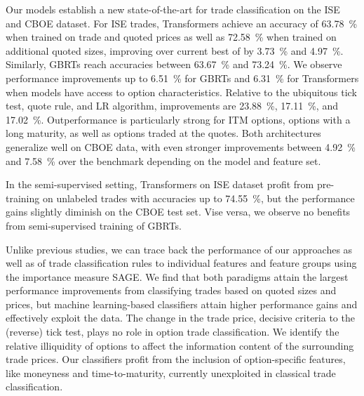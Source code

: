Our models establish a new state-of-the-art for trade classification on the \gls{ISE} and \gls{CBOE} dataset. For \gls{ISE} trades, Transformers achieve an accuracy of \SI{63.78}{\percent} when trained on trade and quoted prices as well as \SI{72.58}{\percent} when trained on additional quoted sizes, improving over current best of \textcite[][27]{grauerOptionTradeClassification2022} by \SI{3.73}{\percent} and \SI{4.97}{\percent}. Similarly, \glspl{GBRT} reach accuracies between \SI{63.67}{\percent} and \SI{73.24}{\percent}. We observe performance improvements up to \SI{6.51}{\percent} for \glspl{GBRT} and \SI{6.31}{\percent} for Transformers when models have access to option characteristics. Relative to the ubiquitous tick test, quote rule, and \gls{LR} algorithm, improvements are \SI{23.88}{\percent}, \SI{17.11}{\percent}, and \SI{17.02}{\percent}. Outperformance is particularly strong for \gls{ITM} options, options with a long maturity, as well as options traded at the quotes. Both architectures generalize well on \gls{CBOE} data, with even stronger improvements between \SI{4.92}{\percent} and \SI{7.58}{\percent} over the benchmark depending on the model and feature set. 

In the semi-supervised setting, Transformers on \gls{ISE} dataset profit from pre-training on unlabeled trades with accuracies up to \SI{74.55}{\percent}, but the performance gains slightly diminish on the \gls{CBOE} test set. Vise versa, we observe no benefits from semi-supervised training of \glspl{GBRT}.

Unlike previous studies, we can trace back the performance of our approaches as well as of trade classification rules to individual features and feature groups using the importance measure \gls{SAGE}. We find that both paradigms attain the largest performance improvements from classifying trades based on quoted sizes and prices, but machine learning-based classifiers attain higher performance gains and effectively exploit the data. The change in the trade price, decisive criteria to the (reverse) tick test, plays no role in option trade classification. We identify the relative illiquidity of options to affect the information content of the surrounding trade prices. Our classifiers profit from the inclusion of option-specific features, like moneyness and time-to-maturity, currently unexploited in classical trade classification.

